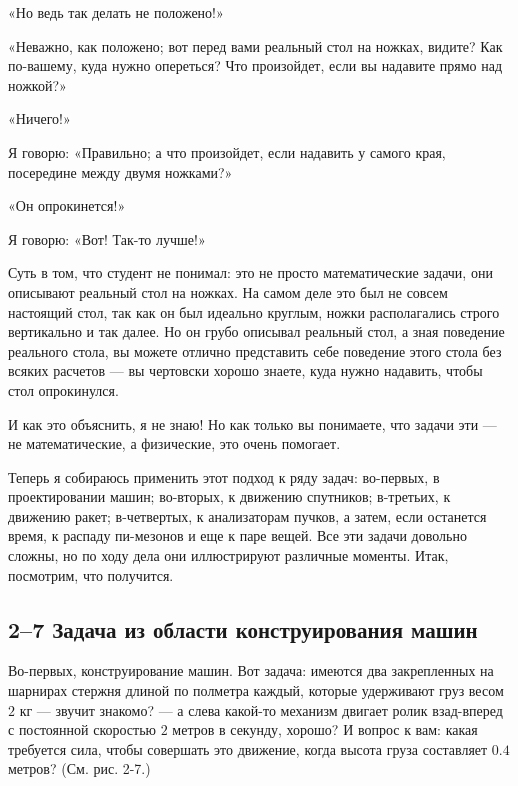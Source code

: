 \documentclass[11pt,oneside]{article}
\begin{document}
«Но ведь так делать не положено!»\par

«Неважно, как положено; вот перед вами реальный стол на ножках, видите? Как по-вашему, куда нужно опереться? Что произойдет, если вы надавите прямо над ножкой?»\par

«Ничего!»\par

Я говорю: «Правильно; а что произойдет, если надавить у самого края, посередине между двумя ножками?»\par

«Он опрокинется!»\par

Я говорю: «Вот! Так-то лучше!»\par

Суть в том, что студент не понимал: это не просто математические задачи, они описывают реальный стол на ножках. На самом деле это был не совсем настоящий стол, так как он был идеально круглым, ножки располагались строго вертикально и так далее. Но он грубо описывал реальный стол, а зная поведение реального стола, вы можете отлично представить себе поведение этого стола без всяких расчетов --- вы чертовски хорошо знаете, куда нужно надавить, чтобы стол опрокинулся.\par

И как это объяснить, я не знаю! Но как только вы понимаете, что задачи эти --- не математические, а физические, это очень помогает.\par

Теперь я собираюсь применить этот подход к ряду задач: во-первых, в проектировании машин; во-вторых, к движению спутников; в-третьих, к движению ракет; в-четвертых, к анализаторам пучков, а затем, если останется время, к распаду пи-мезонов и еще к паре вещей. Все эти задачи довольно сложны, но по ходу дела они иллюстрируют различные моменты. Итак, посмотрим, что получится.\par

\subsection*{2--7 Задача из области конструирования машин}

Во-первых, конструирование машин. Вот задача: имеются два закрепленных на шарнирах стержня длиной по полметра каждый, которые удерживают груз весом \(2\) кг --- звучит знакомо? --- а слева какой-то механизм двигает ролик взад-вперед с постоянной скоростью \(2\) метров в секунду, хорошо? И вопрос к вам: какая требуется сила, чтобы совершать это движение, когда высота груза составляет \(\mathrm{0.4}\) метров? (См. рис. 2-7.)\par
\end{document}
